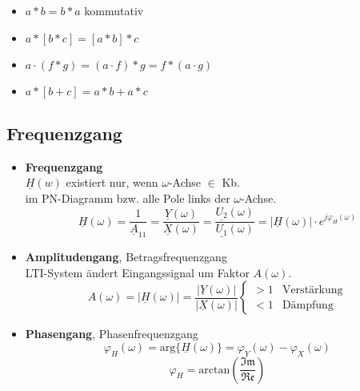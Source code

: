 \begin{mdframed}[style=exercise,frametitle=Rechenregeln]
  \begin{itemize}
	\item {$a*b=b*a$} {\small \qquad kommutativ}
	\item $a*[b*c]=[a*b]*c$
	\item $a\cdot(f*g)=(a\cdot f) * g = f * (a\cdot g)$
	\item $a*[b+c]=a*b+a*c$
  \end{itemize}
\end{mdframed}
\clearpage
\subsection{Frequenzgang}
  \begin{itemize}
      \item{\textbf{Frequenzgang}}\\
      \small{$\underline{H}(w)$ existiert nur, wenn $\omega$-Achse $\in$ Kb.\\ im PN-Diagramm bzw. alle Pole links der $\omega$-Achse.}
          \[
              \underline{H}(\omega) = \frac{1}{\underline{A}_{11}} =
              \frac{\underline{Y}(\omega)}{\underline{X}(\omega)} =
              \frac{\underline{U_2}(\omega)}{\underline{U_1}(\omega)} = |\underline{H}(\omega)|\cdot e^{j\varphi_H(\omega)}
          \]
      \item{\textbf{Amplitudengang}}, Betragsfrequenzgang\\
      \small{LTI-System ändert Eingangssignal um Faktor $A(\omega)$}.
          \[
              A(\omega) = |\underline{H}(\omega)| =
              \frac{|\underline{Y}(\omega)|}{|\underline{X}(\omega)|}
              \begin{cases}
                  > 1 & \text{Verst\"arkung}\\
                  < 1 & \text{D\"ampfung}
              \end{cases}
          \]
      \item{\textbf{Phasengang}}, Phasenfrequenzgang\\
          \[
              \varphi_H(\omega) = \text{arg}\{\underline{H}(\omega)\} =
              \varphi_Y(\omega) - \varphi_X(\omega)
          \]
          \[
              \varphi_H = \text{arctan}\left(\frac{\mathfrak{Im}}{\mathfrak{Re}}\right)
          \]
  \end{itemize}

